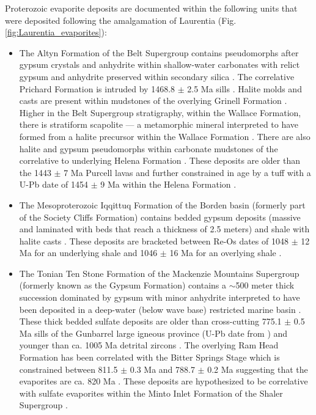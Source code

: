 \documentclass[twocolumn, switch]{article} %
\begin{document}
Proterozoic evaporite deposits are documented within the following units that were deposited following the amalgamation of Laurentia (Fig. \ref{fig:Laurentia_evaporites}): 
\begin{itemize}
\item The Altyn Formation of the Belt Supergroup contains pseudomorphs after gypsum crystals and anhydrite within shallow-water carbonates with relict gypsum and anhydrite preserved within secondary silica \citep{White1984a}. The correlative Prichard Formation is intruded by 1468.8 $\pm$ 2.5 Ma sills \citep{Sears1998a}. Halite molds and casts are present within mudstones of the overlying Grinell Formation \citep{Pratt2019a}. Higher in the Belt Supergroup stratigraphy, within the Wallace Formation, there is stratiform scapolite --- a metamorphic mineral interpreted to have formed from a halite precursor within the Wallace Formation \citep{Hietanen1967a}. There are also halite and gypsum pseudomorphs within carbonate mudstones of the correlative to underlying Helena Formation \citep{Pratt2001a,Winston2007a}.  These deposits are older than the 1443 $\pm$ 7 Ma Purcell lavas and further constrained in age by a tuff with a U-Pb date of 1454 $\pm$ 9 Ma within the Helena Formation \citep{Evans2000c}. 
\item The Mesoproterozoic Iqqittuq Formation of the Borden basin (formerly part of the Society Cliffs Formation) contains bedded gypsum deposits (massive and laminated with beds that reach a thickness of 2.5 meters) and shale with halite casts \citep{Kah2001a}.  These deposits are bracketed between Re-Os dates of 1048 $\pm$ 12 Ma for an underlying shale and 1046 $\pm$ 16 Ma for an overlying shale \citep{Gibson2018a}.
\item The Tonian Ten Stone Formation of the Mackenzie Mountains Supergroup (formerly known as the Gypsum Formation) contains a $\sim$500 meter thick succession dominated by gypsum with minor anhydrite interpreted to have been deposited in a deep-water (below wave base) restricted marine basin \citep{Turner2016a}. These thick bedded sulfate deposits are older than cross-cutting 775.1 $\pm$ 0.5 Ma sills of the Gunbarrel large igneous province (U-Pb date from \citealp{Milton2017a}) and younger than ca. 1005 Ma detrital zircons \citep{Turner2016a}. The overlying Ram Head Formation has been correlated with the Bitter Springs Stage which is constrained between 811.5 $\pm$ 0.3 Ma and 788.7 $\pm$ 0.2 Ma \citep{Macdonald2010a, Swanson-Hysell2015a} suggesting that the evaporites are ca. 820 Ma \citep{Turner2016a}. These deposits are hypothesized to be correlative with sulfate evaporites within the Minto Inlet Formation of the Shaler Supergroup \citep{Jones2010a, Turner2016a}.

\end{itemize}
\end{document}
